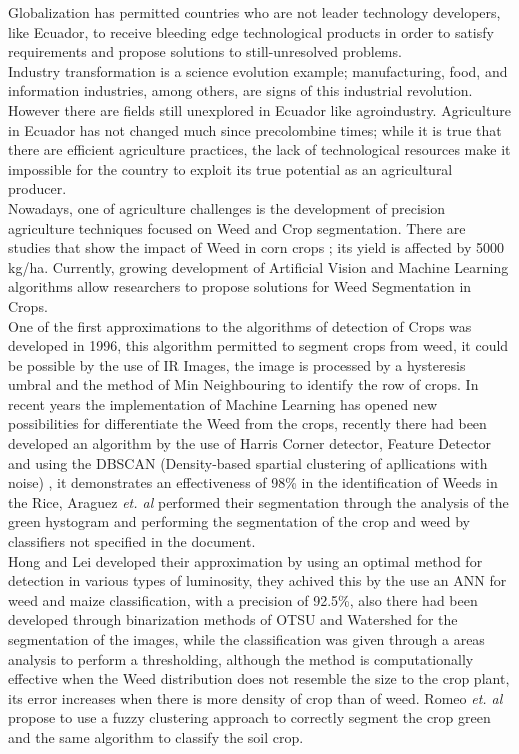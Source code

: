 \documentclass[conference]{IEEEtran}
\begin{document}
Globalization has permitted countries who are not leader technology developers, like Ecuador, to receive bleeding edge technological products in order to satisfy requirements and propose solutions to still-unresolved problems.
\\

Industry transformation is a science evolution example; manufacturing, food, and information industries, among others, are signs of this industrial revolution. However there are fields still unexplored  in Ecuador like agroindustry. Agriculture in Ecuador has not changed much since precolombine times; while it is true that there are efficient agriculture practices, the lack of technological resources make it impossible for the country to exploit its true potential as an agricultural producer.
\\

Nowadays, one of agriculture challenges is the development of precision agriculture techniques focused on Weed and Crop segmentation. There are studies that show the impact of Weed in corn crops \cite{Suarez:Pinero}; its yield is affected by 5000 kg/ha. Currently, growing development of Artificial Vision and Machine Learning algorithms allow researchers to propose solutions for Weed Segmentation in Crops. 
\\

One of the first approximations to the algorithms of detection of Crops was  developed in 1996\cite{Brivot:Marchant}, this algorithm permitted to segment crops from weed, it could be possible by the use of IR Images, the image is processed by a hysteresis umbral and the method of Min Neighbouring to identify the row of crops. In recent years the implementation of Machine Learning has opened new possibilities for differentiate the Weed from the crops, recently \cite{Cheng:Mason} there had been developed an algorithm by the use of Harris Corner detector, Feature Detector and using the DBSCAN (Density-based spartial clustering of apllications with noise) , it demonstrates an effectiveness of  98\% in the identification of Weeds in the Rice, Araguez \textit{et. al} \cite{Araguez}  performed their segmentation through the analysis of the green hystogram and performing the segmentation of the crop and weed by classifiers not specified in the document. 
\\

Hong and Lei \cite{Hong:Lei} developed their approximation by using an optimal method for detection in various types of luminosity, they achived this by the use an ANN for weed and maize classification, with a precision of 92.5\%,  also there had been developed \cite{Su:Hnin} through binarization methods of OTSU and Watershed for the segmentation of the images, while the classification was given through a areas analysis to perform a thresholding, although the method is computationally effective when the Weed distribution does not resemble the size to the crop plant, its error increases when there is more density of crop than of weed. Romeo \textit{et. al} \cite{Romeo} propose to use a fuzzy clustering approach to correctly segment the crop green and the same algorithm to classify the soil crop.
\\
\end{document}

